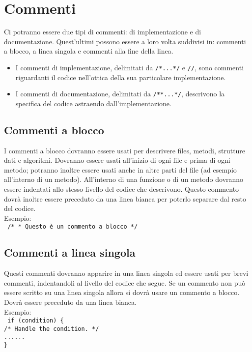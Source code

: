 \section{Commenti}
Ci potranno essere due tipi di commenti: di implementazione e di documentazione. Quest'ultimi possono essere a loro volta suddivisi in: commenti a blocco, a linea singola e commenti alla fine della linea.
\begin{itemize}
\item I commenti di implementazione, delimitati da \texttt{/*...*/} e \texttt{//}, sono commenti riguardanti il codice nell'ottica della sua particolare implementazione.
\item I commenti di documentazione, delimitati da \texttt{/**...*/}, descrivono la specifica del codice astraendo dall'implementazione.
\end{itemize}
\subsection{Commenti a blocco}
I commenti a blocco dovranno essere usati per descrivere files, metodi, strutture dati e algoritmi. Dovranno essere usati all'inizio di ogni file e prima di ogni metodo; potranno inoltre essere usati anche in altre parti del file (ad esempio all'interno di un metodo). All'interno di una funzione o di un metodo dovranno essere indentati allo stesso livello del codice che descrivono. Questo commento dovr\`a inoltre essere preceduto da una linea bianca per poterlo separare dal resto del codice. \\
 \newline
Esempio: \\
\texttt{
	/* \newline
	* Questo è un commento a blocco \newline
	*/
} \\
 \newline
\subsection{Commenti a linea singola}
Questi commenti dovranno apparire in una linea singola ed essere usati per brevi commenti, indentandoli al livello del codice che segue. Se un commento non pu\`o essere scritto su una linea singola allora si dovr\`a usare un commento a blocco. Dovr\`a essere preceduto da una linea bianca. \\
 \newline
Esempio: \\
\texttt{
	if (condition) \{ \\
	\phantom{....}/* Handle the condition. */ \\
	\phantom{....}...... \\
	\}
} \\
 \newline
